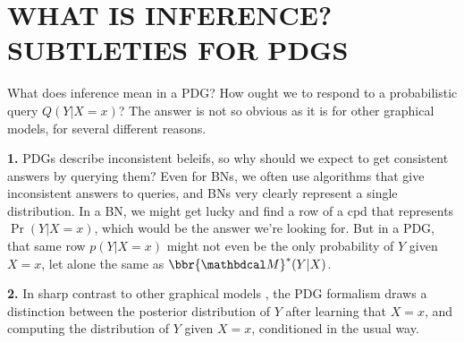 \documentclass{article}
\begin{document}
\section{WHAT IS INFERENCE? SUBTLETIES FOR PDGS}

What does inference mean in a PDG?
How ought we to respond to a probabilistic query $Q(Y|X{=}x)$?
The answer is not so obvious as it is for other graphical models,
for several different reasons.

\textbf{1.}
PDGs describe inconsistent beleifs,
so why should we expect to get consistent answers by querying them?
Even for BNs, we often use algorithms that give inconsistent answers to queries, and BNs very clearly represent a single distribution.
%
In a BN, we might get lucky and find a row of a cpd that represents $\Pr(Y|X{=}x)$, which would be the answer we're looking for.
But in a PDG, that same row  $p(Y | X{=}x)$ might not even be the only probability of $Y$ given $X{=}x$, let alone the same as $\bbr{\dg M}^*(Y|X)$.

\textbf{2.}
In sharp contrast to other graphical models \parencite[pg 26]{koller2009probabilistic},
the PDG formalism draws a distinction between
the posterior distribution of $Y$ after learning that $X{=}x$,
and computing the distribution of $Y$ given $X{=}x$, conditioned in the usual way.
\end{document}
